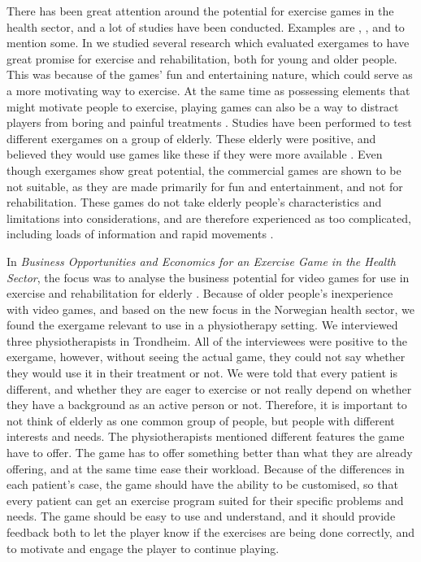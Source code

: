 There has been great attention around the potential for exercise games in the health sector, and a lot of studies have been conducted. Examples are \cite{exergamesforelderly}, \cite{gerling1}, \cite{ijsselsteijn2007digital} and \cite{garcia2012exergames} to mention some. In \cite{project} we studied several research which evaluated exergames to have great promise for exercise and rehabilitation, both for young and older people. This was because of the games' fun and entertaining nature, which could serve as a more motivating way to exercise. At the same time as possessing elements that might motivate people to exercise, playing games can also be a way to distract players from boring and painful treatments \cite{taylor2011activity}. Studies have been performed to test different exergames on a group of elderly. These elderly were positive, and believed they would use games like these if they were more available \cite{excell}. Even though exergames show great potential, the commercial games are shown to be not suitable, as they are made primarily for fun and entertainment, and not for rehabilitation. These games do not take elderly people's characteristics and limitations into considerations, and are therefore experienced as too complicated, including loads of information and rapid movements \cite{exergamesforelderly}.

In \emph{Business Opportunities and Economics for an Exercise Game in the Health Sector}, the focus was to analyse the business potential for video games for use in exercise and rehabilitation for elderly \cite{project}. Because of older people's inexperience with video games, and based on the new focus in the Norwegian health sector, we found the exergame relevant to use in a physiotherapy setting. We interviewed three physiotherapists in Trondheim. All of the interviewees were positive to the exergame, however, without seeing the actual game, they could not say whether they would use it in their treatment or not. We were told that every patient is different, and whether they are eager to exercise or not really depend on whether they have a background as an active person or not. Therefore, it is important to not think of elderly as one common group of people, but people with different interests and needs. The physiotherapists mentioned different features the game have to offer. The game has to offer something better than what they are already offering, and at the same time ease their workload. Because of the differences in each patient's case, the game should have the ability to be customised, so that every patient can get an exercise program suited for their specific problems and needs. The game should be easy to use and understand, and it should provide feedback both to let the player know if the exercises are being done correctly, and to motivate and engage the player to continue playing. 

